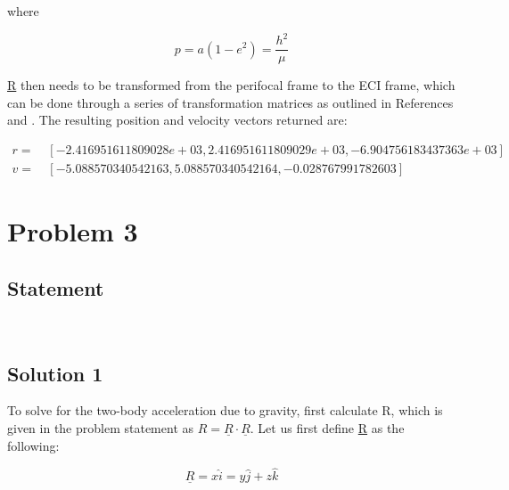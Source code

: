 \documentclass[conf]{new-aiaa}
\begin{document}
where 

\begin{equation}
p = a ( 1 - e^2 ) = \dfrac{h^2}{\mu} 
\end{equation}

\underline{R} then needs to be transformed from the perifocal frame to the ECI frame, which can be done through a series of transformation matrices as outlined in References \cite{bate_astrodynamics} and \cite{jah_mod2}. The resulting position and velocity vectors returned are: 

\begin{equation}
\begin{aligned}
r = &~ [ -2.416951611809028e+03, 2.416951611809029e+03, -6.904756183437363e+03 ] \\
v = &~ [ -5.088570340542163, 5.088570340542164, -0.028767991782603 ]
\end{aligned}
\end{equation}



\section{Problem 3} 

\subsection{Statement} 
\begin{center}
	 \\
\end{center}

\subsection{Solution 1} 

To solve for the two-body acceleration due to gravity, first calculate R, which is given in the problem statement as $R = \underline{R} \cdot \underline{R}$. Let us first define \underline{R} as the following: 

\begin{equation}
\underline{R} = x \hat{i} = y \hat{j} + z \hat{k}
\end{equation}
\end{document}
